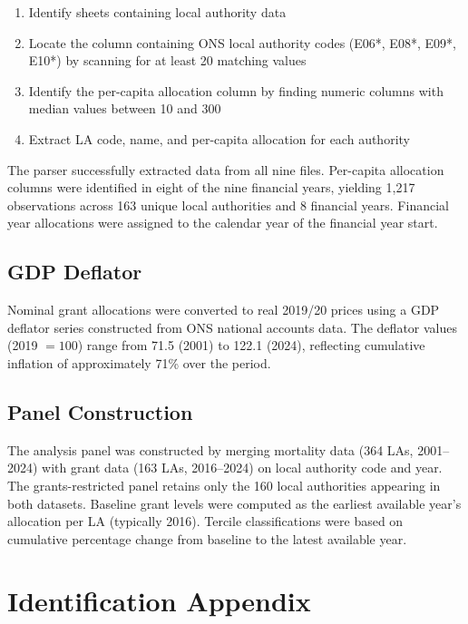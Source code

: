 \documentclass[12pt]{article}
\begin{document}
\begin{enumerate}
\item Identify sheets containing local authority data
\item Locate the column containing ONS local authority codes (E06*, E08*, E09*, E10*) by scanning for at least 20 matching values
\item Identify the per-capita allocation column by finding numeric columns with median values between 10 and 300
\item Extract LA code, name, and per-capita allocation for each authority
\end{enumerate}

The parser successfully extracted data from all nine files. Per-capita allocation columns were identified in eight of the nine financial years, yielding 1,217 observations across 163 unique local authorities and 8 financial years. Financial year allocations were assigned to the calendar year of the financial year start.

\subsection{GDP Deflator}

Nominal grant allocations were converted to real 2019/20 prices using a GDP deflator series constructed from ONS national accounts data. The deflator values (2019 $= 100$) range from 71.5 (2001) to 122.1 (2024), reflecting cumulative inflation of approximately 71\% over the period.

\subsection{Panel Construction}

The analysis panel was constructed by merging mortality data (364 LAs, 2001--2024) with grant data (163 LAs, 2016--2024) on local authority code and year. The grants-restricted panel retains only the 160 local authorities appearing in both datasets. Baseline grant levels were computed as the earliest available year's allocation per LA (typically 2016). Tercile classifications were based on cumulative percentage change from baseline to the latest available year.


\section{Identification Appendix}
\label{app:identification}
\end{document}
